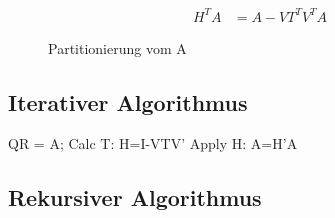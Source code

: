 \begin{align}
	H^T A &= A - V T^T V^T A
\end{align}

\begin{figure} 
	
	\caption{Partitionierung vom A}
	\label{fig:patrA}
\end{figure}


\subsection{Iterativer Algorithmus}

\begin{algorithmic}
	\State QR = A;
		\State Calc T: H=I-VTV'
		\State Apply H: A=H'A
	\EndIf
\EndFor

\end{algorithmic}


\subsection{Rekursiver Algorithmus}


